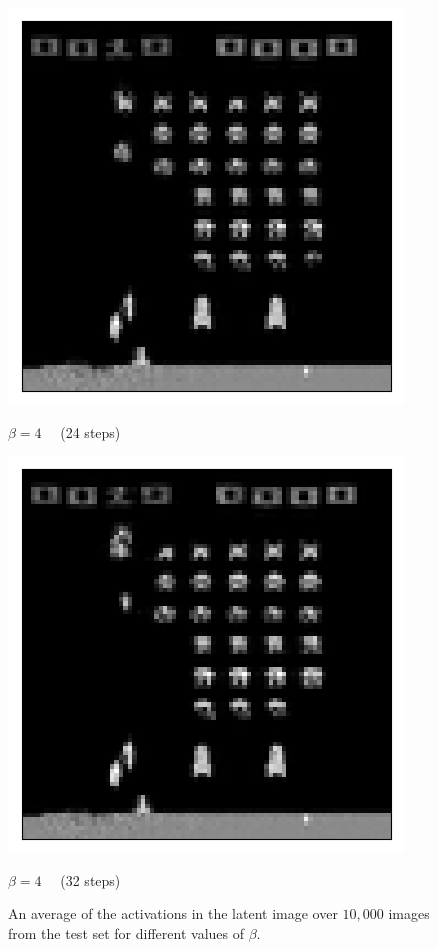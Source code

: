 \begin{figure}[h!]
\begin{multicols}{4}
    \includegraphics[scale=0.4]{figures/results/weighted_average/beta_4_posterior_sample_24.png}
    \caption{$\beta=4\quad$ (24 steps)}
    \includegraphics[scale=0.4]{figures/results/weighted_average/beta_4_posterior_sample_32.png}
    \caption{$\beta=4\quad$ (32 steps)}
\end{multicols}

\caption{An average of the activations in the latent image over $10,000$ images from the test set for different values of $\beta$.}
\label{fig:weighted_average_posterior_samples}
\end{figure}



